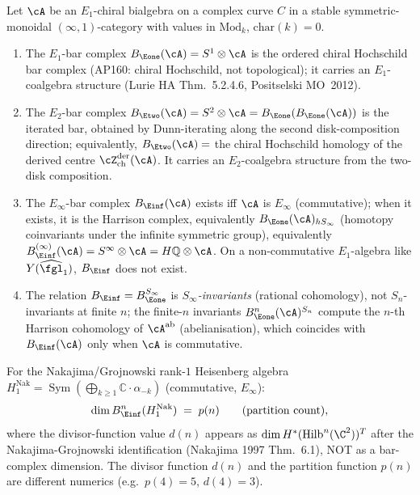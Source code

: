 \begin{theorem}
\label{thm:three-bar-heal}
Let $\cA$ be an $E_1$-chiral bialgebra on a complex curve $C$ in a
stable symmetric-monoidal $(\infty,1)$-category with values in
$\mathrm{Mod}_k$, $\mathrm{char}(k) = 0$.
\begin{enumerate}[label=\textup{(\roman*)}]
\item The $E_1$-bar complex $B_{\Eone}(\cA) = S^1\otimes\cA$
is the ordered chiral Hochschild bar complex (AP160: chiral
Hochschild, not topological); it carries an
$E_1$-coalgebra structure (Lurie HA Thm.~5.2.4.6, Positselski
MO~2012).
\item The $E_2$-bar complex $B_{\Etwo}(\cA) = S^2\otimes\cA = B_{\Eone}(B_{\Eone}(\cA))$
is the iterated bar, obtained by Dunn-iterating along the second
disk-composition direction; equivalently,
$B_{\Etwo}(\cA) = $ the chiral Hochschild homology of the derived centre
$\cZ^{\mathrm{der}}_{\mathrm{ch}}(\cA)$.  It carries an
$E_2$-coalgebra structure from the two-disk composition.
\item The $E_\infty$-bar complex $B_{\Einf}(\cA)$ exists iff $\cA$
is $E_\infty$ (commutative); when it exists, it is the Harrison
complex, equivalently $B_{\Eone}(\cA)_{hS_\infty}$ (homotopy
coinvariants under the infinite symmetric group), equivalently
$B_{\Einf}^{(\infty)}(\cA) = S^\infty\otimes\cA = H\mathbb Q\otimes\cA$.
On a non-commutative $E_1$-algebra like $Y(\widehat{\fgl}_1)$,
$B_{\Einf}$ does not exist.
\item The relation $B_{\Einf} = B_{\Eone}^{S_\infty}$ is
\emph{$S_\infty$-invariants} (rational cohomology), not
$S_n$-invariants at finite $n$; the finite-$n$ invariants
$B_{\Eone}^n(\cA)^{S_n}$ compute the $n$-th Harrison cohomology
of $\cA^{\mathrm{ab}}$ (abelianisation), which coincides with
$B_{\Einf}(\cA)$ only when $\cA$ is commutative.
\end{enumerate}
For the Nakajima/Grojnowski rank-$1$ Heisenberg algebra
$H_1^{\mathrm{Nak}} = \operatorname{Sym}(\bigoplus_{k\geq 1}\mathbb C\cdot\alpha_{-k})$
(commutative, $E_\infty$):
\[
\dim B_{\Einf}^n(H_1^{\mathrm{Nak}}) \;=\; p(n) \qquad (\text{partition
count}),
\]
where the divisor-function value $d(n)$ appears as
$\dim H^*(\mathrm{Hilb}^n(\C^2))^{T}$ after the Nakajima-Grojnowski
identification (Nakajima 1997 Thm.~6.1), NOT as a bar-complex
dimension.  The divisor function $d(n)$ and the partition function
$p(n)$ are different numerics (e.g.\ $p(4) = 5$, $d(4) = 3$).
\end{theorem}

